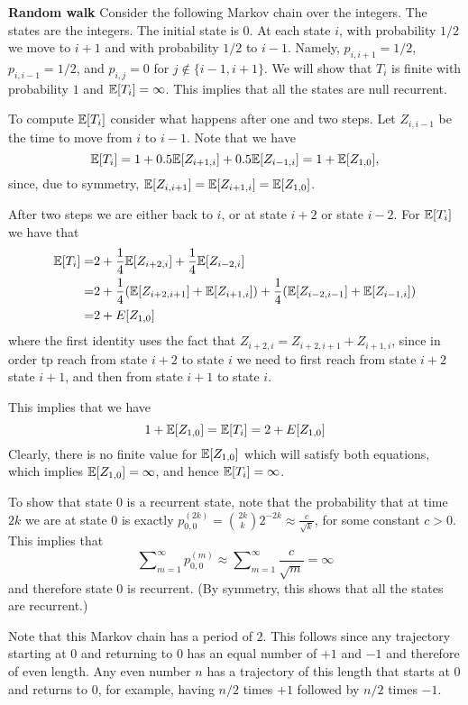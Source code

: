 \begin{example}{\bf Random walk}
Consider the following Markov chain over the integers. The states
are the integers. The initial state is $0$. At each state $i$, with
probability $1/2$ we move to $i+1$ and with probability $1/2$ to
$i-1$. Namely, $p_{i,i+1}=1/2$, $p_{i,i-1}=1/2$, and $p_{i,j} =0$
for $j \not\in \{i-1,i+ 1\}$. We will show that $T_i$ is finite with
probability $1$ and $\mathbb{E}[T_i]=\infty$. This implies that all the
states are null recurrent.

To compute $\mathbb{E}[T_i]$ consider what happens after one and two steps. Let
$Z_{i,i-1}$ be the time to move from $i$ to $i-1$. Note that  we
have \[
\mathbb{E}[T_i]=1+0.5\mathbb{E}[Z_{i+1,i}]+0.5\mathbb{E}[Z_{i-1,i}]=1+\mathbb{E}[Z_{1,0}],
\]
since, due to symmetry, $\mathbb{E}[Z_{i,i+1}]=\mathbb{E}[Z_{i+1,i}]=\mathbb{E}[Z_{1,0}]$.

After two steps we are either back to $i$, or at state $i+2$ or state $i-2$.
For $\mathbb{E}[T_i]$ we have that
\begin{align*}
\mathbb{E}[T_i]=&
2+\frac{1}{4}\mathbb{E}[Z_{i+2,i}]+\frac{1}{4}\mathbb{E}[Z_{i-2,i}] \\
=&2+\frac{1}{4} (\mathbb{E}[Z_{i+2,i+1}]+\mathbb{E}[Z_{i+1,i}])+\frac{1}{4}( \mathbb{E}[Z_{i-2,i-1}]+\mathbb{E}[Z_{i-1,i}])\\
 =&2+E[Z_{1,0}]\\
\end{align*}
where the first identity uses the fact that $Z_{i+2,i}=Z_{i+2,i+1}+Z_{i+1,i}$, since in order tp reach from state $i+2$ to state $i$ we need to first reach from state $i+2$ state $i+1$, and then from state $i+1$ to state $i$.

This implies that we have
\[
1+\mathbb{E}[Z_{1,0}]=\mathbb{E}[T_i]=2+E[Z_{1,0}]
\]
Clearly, there is no finite value for $\mathbb{E}[Z_{1,0}]$ which will
satisfy both equations, which implies $\mathbb{E}[Z_{1,0}]=\infty$, and hence
$\mathbb{E}[T_i]=\infty$.

To show that state $0$ is a recurrent state, note that the probability
that at time $2k$ we are at state $0$ is exactly $p_{0,0}^{(2k)}=\binom{2k}{k}2^{-2k}\approx \frac{c}{\sqrt{k}}$, for some constant $c>0$. This
implies that
$$
\sum\nolimits_{m = 1}^\infty {p_{0,0}^{(m)}}\approx \sum\nolimits_{m
= 1}^\infty \frac{c}{\sqrt{m}}=\infty
$$
and therefore state $0$ is recurrent. (By symmetry, this shows that
all the states are recurrent.)

Note that this Markov chain has a period of $2$. This follows since any trajectory starting at $0$ and returning to $0$ has an equal number of $+1$ and $-1$ and therefore of even length. Any even number $n$ has a trajectory of this length that starts at $0$ and returns to $0$, for example, having $n/2$ times $+1$ followed by $n/2$ times $-1$.
\end{example}


